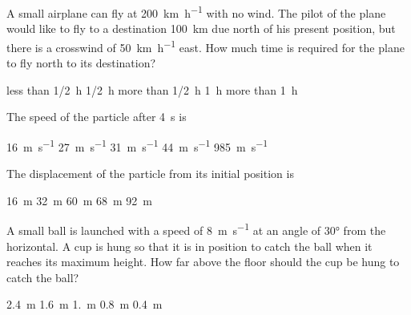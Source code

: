 \documentclass{../../../oss-ap12ibhl}
\begin{document}
\begin{questions}
  \question A small airplane can fly at \SI{200}{\kilo\metre\per\hour} with no
  wind. The pilot of the plane would like to fly to a destination
  \SI{100}{\kilo\metre} due north of his present position, but there is a
  crosswind of \SI{50}{\kilo\metre\per\hour} east. How much time is required
  for the plane to fly north to its destination?
  \begin{choices}
    \choice less than \SI{1/2}{\hour}
    \choice \SI{1/2}{\hour}
    \choice more than \SI{1/2}{\hour}
    \choice \SI{1}{\hour}
    \choice more than \SI{1}{\hour}
  \end{choices}


  \question The speed of the particle after \SI{4}{\second} is
  \begin{choices}
    \choice\SI{16}{\metre\per\second}
    \choice\SI{27}{\metre\per\second}
    \choice\SI{31}{\metre\per\second}
    \choice\SI{44}{\metre\per\second}
    \choice\SI{985}{\metre\per\second}
  \end{choices}
  \label{q:particle1}
    
  \question The displacement of the particle from its initial position is
  \begin{choices}
    \choice\SI{16}{\metre}
    \choice\SI{32}{\metre}
    \choice\SI{60}{\metre}
    \choice\SI{68}{\metre}
    \choice\SI{92}{\metre}
  \end{choices}
  \label{q:particle2}
    
  \question A small ball is launched with a speed of \SI{8}{\metre\per\second}
  at an angle of \ang{30} from the horizontal. A cup is hung so that it is in
  position to catch the ball when it reaches its maximum height. How far above
  the floor should the cup be hung to catch the ball?

  \begin{minipage}{.4\linewidth}
  \end{minipage}
  \begin{minipage}{.4\linewidth}
    \begin{choices}
      \choice\SI{2.4}{\metre}
      \choice\SI{1.6}{\metre}
      \choice\SI{1.}{\metre}
      \choice\SI{.8}{\metre}
      \choice\SI{.4}{\metre}
    \end{choices}
  \end{minipage}


\end{questions}
\end{document}
